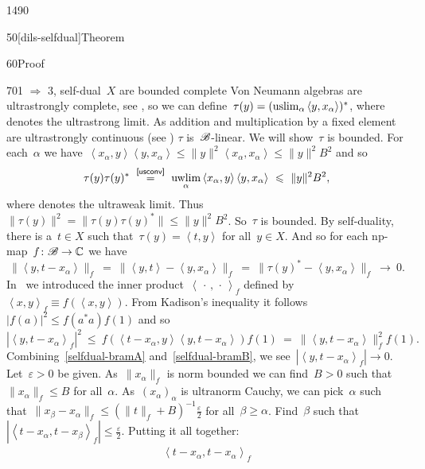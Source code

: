 \begin{parsec}{1490}
\begin{point}{50}[dils-selfdual]{Theorem}
\begin{point}{60}{Proof}
\begin{point}{70}{1 $\Rightarrow$ 3, self-dual~$X$ are bounded complete}
Von Neumann algebras are ultrastrongly complete, see ,
so we can define~$\tau(y) = (\uslim_\alpha \left<y, x_\alpha\right>)^*$,
    where~\Define{$\uslim$} denotes
    the ultrastrong limit.
As addition and multiplication by a fixed element
are ultrastrongly continuous (see )
    $\tau$ is~$\mathscr{B}$-linear.
We will show~$\tau$ is bounded.
For each~$\alpha$ we have~$\left<x_\alpha, y\right>\left<y, x_\alpha\right>
        \leq \|y\|^2\left<x_\alpha, x_\alpha\right> \leq \|y\|^2B^2$ and so
\begin{equation*}
    \tau(y)\tau(y)^*
    \ \overset{\sref{usconv}}{=} \ 
    \uwlim_\alpha \left<x_\alpha,y\right>\left<y,x_\alpha\right>
    \ \leq \ \|y\|^2B^2,
\end{equation*}
where \Define{$\uwlim$}
    denotes the ultraweak limit.
Thus~$\|\tau(y)\|^2 = \|\tau(y)\tau(y)^*\| \leq \|y\|^2B^2$.
So~$\tau$ is bounded.
By self-duality, there is a~$t \in X$ such that~$\tau(y) = \left<t,y\right>$
for all~$y \in X$.
And so for each np-map~$f\colon \mathscr{B} \to \mathbb{C}$ we have
\begin{equation}\label{selfdual-bramA}
    \|\left<y, t-x_\alpha\right>\|_f \ =\ 
    \|\left<y, t\right>-\left<y,x_\alpha\right>\|_f \ =\ 
    \|\tau(y)^*-\left<y,x_\alpha\right>\|_f\  \rightarrow \  0.
\end{equation}
In~\sref{module-innerprod-state}
    we introduced the inner product~$\left<\,\cdot\,,\,\cdot\,\right>_f$
    defined by~$\left<x,y\right>_f \equiv f(\left<x,y\right>)$.
From Kadison's inequality 
it follows~$|f(a)|^2 \leq f(a^*a)f(1)$
and so
\begin{equation}\label{selfdual-bramB}
    |\left<y,t-x_\alpha\right>_f|^2
    \ \leq \ f( \left<t-x_\alpha,y\right> \left<y,t-x_\alpha\right>) f(1)
    \ =\  \| \left<y,t-x_\alpha\right> \|_f^2 f(1).
\end{equation}
Combining~\eqref{selfdual-bramA} and~\eqref{selfdual-bramB},
    we see~$|\left<y,t-x_\alpha\right>_f| \rightarrow 0$.
Let~$\varepsilon > 0$ be given.
As~$\|x_\alpha\|_f$ is norm bounded
we can find~$B > 0$ such that~$\|x_\alpha\|_f \leq B$
for all~$\alpha$.
As~$(x_\alpha)_\alpha$ is ultranorm Cauchy,
we can pick~$\alpha$ such that~$\|x_\beta - x_\alpha\|_f \leq (\|t\|_f + B)^{-1}
\frac{\varepsilon}{2}$ for all~$\beta \geq \alpha$.
Find~$\beta$ such that~$|\left<t-x_\alpha,t-x_\beta\right>_f|
    \leq \frac{\varepsilon}{2}$.
Putting it all together:
\begin{align*}
    \left<t-x_\alpha,t-x_\alpha\right>_f

\end{align*}
\end{point}
\end{point}
\end{point}
\end{parsec}
